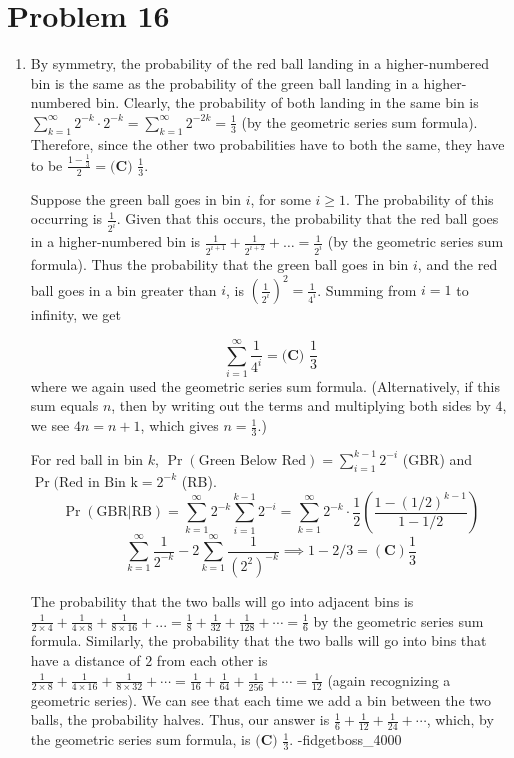 \documentclass{article}%
\begin{document}
\section*{Problem 16}%
\label{sec:Problem16}%
\begin{enumerate}%
\item%
By symmetry, the probability of the red ball landing in a higher-numbered bin is the same as the probability of the green ball landing in a higher-numbered bin. Clearly, the probability of both landing in the same bin is $\sum_{k=1}^{\infty}{2^{-k} \cdot 2^{-k}} = \sum_{k=1}^{\infty}2^{-2k} = \frac{1}{3}$ (by the geometric series sum formula). Therefore, since the other two probabilities have to both the same, they have to be $\frac{1-\frac{1}{3}}{2} = \boxed{\textbf{(C) } \frac{1}{3}}$.

Suppose the green ball goes in bin $i$, for some $i \ge 1$. The probability of this occurring is $\frac{1}{2^i}$. Given that this occurs, the probability that the red ball goes in a higher-numbered bin is $\frac{1}{2^{i+1}} + \frac{1}{2^{i+2}} + \ldots = \frac{1}{2^i}$ (by the geometric series sum formula). Thus the probability that the green ball goes in bin $i$, and the red ball goes in a bin greater than $i$, is $\left(\frac{1}{2^i}\right)^2 = \frac{1}{4^i}$. Summing from $i=1$ to infinity, we get

\[\sum_{i=1}^{\infty} \frac{1}{4^i} = \boxed{\textbf{(C) } \frac{1}{3}}\]
where we again used the geometric series sum formula. (Alternatively, if this sum equals $n$, then by writing out the terms and multiplying both sides by $4$, we see $4n = n+1$, which gives $n = \frac{1}{3}$.)

For red ball in bin $k$, $\Pr(\text{Green Below Red})=\sum\limits_{i=1}^{k-1}2^{-i}$ (GBR) and $\Pr(\text{Red in Bin k}=2^{-k}$ (RB). 
\[\Pr(\text{GBR}|\text{RB})=\sum\limits_{k=1}^{\infty}2^{-k}\sum\limits_{i=1}^{k-1}2^{-i}=\sum\limits_{k=1}^{\infty}2^{-k}\cdot\frac{1}{2}(\frac{1-(1/2)^{k-1}}{1-1/2})\]
\[\sum\limits_{k=1}^{\infty}\frac{1}{2^{-k}}-2\sum\limits_{k=1}^\infty\frac{1}{(2^2)^{-k}}\implies 1-2/3=\boxed{(\textbf{C}) \frac{1}{3}}\]

The probability that the two balls will go into adjacent bins is $\frac{1}{2\times4} + \frac{1}{4\times8} + \frac{1}{8 \times 16} + ... = \frac{1}{8} + \frac{1}{32} + \frac{1}{128} + \cdots = \frac{1}{6}$ by the geometric series sum formula. Similarly, the probability that the two balls will go into bins that have a distance of $2$ from each other is $\frac{1}{2 \times 8} + \frac{1}{4 \times 16} + \frac{1}{8 \times 32} + \cdots = \frac{1}{16} + \frac{1}{64} + \frac{1}{256} + \cdots = \frac{1}{12}$ (again recognizing a geometric series). We can see that each time we add a bin between the two balls, the probability halves. Thus, our answer is $\frac{1}{6} + \frac{1}{12} + \frac{1}{24} + \cdots$, which, by the geometric series sum formula, is $\boxed{\textbf{(C) } \frac{1}{3}}$.
-fidgetboss\_4000


\end{enumerate}
\end{document}

